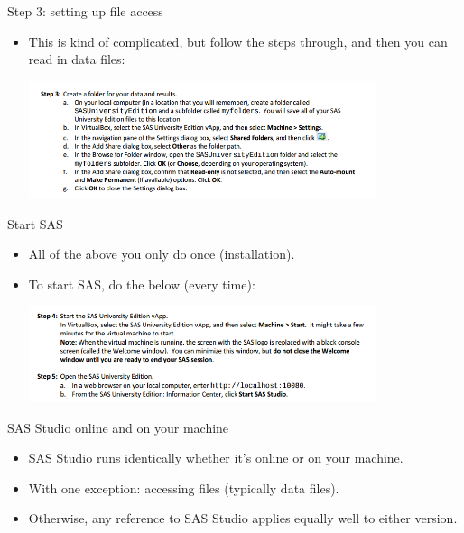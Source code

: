 \documentclass[unknownkeysallowed]{beamer}\usepackage[]{graphicx}\usepackage[]{color}
\begin{document}
\begin{frame}[fragile]{Step 3: setting up file access}
  
  \begin{itemize}
  \item This is kind of complicated, but follow the steps through, and
    then you can read in data files:
    
    \includegraphics[width=4in]{sas25}
  \end{itemize}
  
\end{frame}

\begin{frame}[fragile]{Start SAS}
  
  \begin{itemize}
  \item All of the above you only do once (installation).
  \item To start SAS, do the below (every time):
    
    \includegraphics[width=4in]{sas26}
  \end{itemize}
  
\end{frame}


\begin{frame}[fragile]{SAS Studio online and on your machine}

  \begin{itemize}
  \item SAS Studio runs identically whether it's online or on your machine.
  \item With one exception: accessing files (typically data files).
  \item Otherwise, any reference to SAS Studio applies equally well to
    either version.
  \end{itemize}
  
\end{frame}
\end{document}
